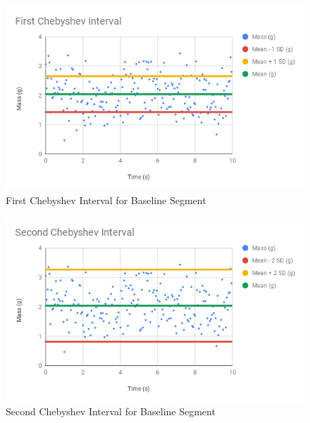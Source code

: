 \begin{figure}
    \begin{center}
        \includegraphics[scale=0.77]{images/00-intro/baseline-chebyshev-1.png}
    \end{center}
    \caption{First Chebyshev Interval for Baseline Segment}
    \label{figure.baseline.chebyshev.1}
\end{figure}
\begin{figure}
    \begin{center}
        \includegraphics[scale=0.77]{images/00-intro/baseline-chebyshev-2.png}
    \end{center}
    \caption{Second Chebyshev Interval for Baseline Segment}
    \label{figure.baseline.chebyshev.2}
\end{figure}
